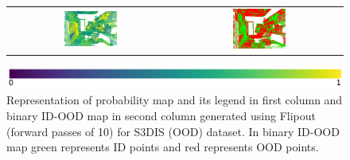 \begin{figure}[h!]
\begin{tabular}{cc}
            \includegraphics[width=0.33\textwidth, height=0.18\textheight]{images/ood_imgs/fout_s3dis/ofc_42_fout_prob.pdf}& 
            \includegraphics[width=0.33\textwidth, height=0.18\textheight]{images/ood_imgs/fout_s3dis/fout_prob_1.pdf}\\
        \end{tabular}
        \includegraphics[scale=0.45]{images/prob_legend.pdf}
        \caption{Representation of probability map and its legend in first column and binary ID-OOD map in second column generated using Flipout (forward passes of 10) for S3DIS (OOD) dataset. In binary ID-OOD map green represents ID points and red represents OOD points.}
        \label{fig:fout_s3dis_oodmap_prob}
    \end{figure}



